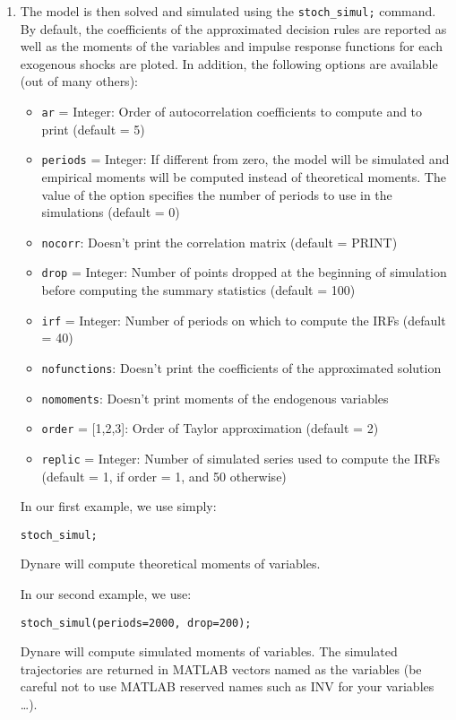 \documentclass[11pt,a4paper]{article}
\begin{document}
\begin{enumerate}
\item The model is then solved and simulated using the {\tt stoch\_simul;} command. By default, the coefficients of the approximated decision rules are reported as well as the moments of the variables and impulse response functions for each exogenous shocks are ploted. In addition, the following options are available (out of many others):
\begin{itemize}
\item {\tt ar} = Integer:
Order of autocorrelation coefficients to compute and to print (default = 5)
\item {\tt periods} = Integer:
If different from zero, the model will be simulated and empirical moments will be computed instead of theoretical moments. The value of the option specifies the number of periods to use in the simulations (default = 0)
\item {\tt nocorr}:
Doesn't print the correlation matrix (default = PRINT)
\item {\tt drop} = Integer:
Number of points dropped at the beginning of simulation before computing the summary statistics (default = 100)
\item {\tt irf} = Integer:
Number of periods on which to compute the IRFs (default = 40)
\item {\tt nofunctions}:
Doesn't print the coefficients of the approximated solution
\item {\tt nomoments}:
Doesn't print moments of the endogenous variables
\item {\tt order} = [1,2,3]:
Order of Taylor approximation (default = 2)
\item {\tt replic} = Integer:
Number of simulated series used to compute the IRFs (default = 1, if order = 1, and 50 otherwise)
\end{itemize}

In our first example, we use simply:
\begin{verbatim}
stoch_simul;
\end{verbatim}
{\sc Dynare} will compute theoretical moments of variables.

In our second example, we use:
\begin{verbatim}
stoch_simul(periods=2000, drop=200);
\end{verbatim}
{\sc Dynare} will compute simulated moments of variables. The simulated trajectories are returned in MATLAB vectors named as the variables (be careful not to use MATLAB reserved names such as INV for your variables \ldots).
\end{enumerate}
\end{document}
